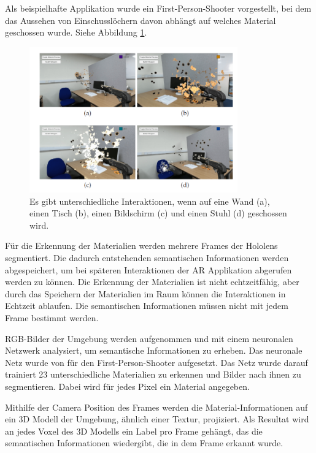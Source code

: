 Als beispielhafte Applikation wurde ein First-Person-Shooter vorgestellt, bei dem das Aussehen von Einschusslöchern davon abhängt auf welches Material geschossen wurde. Siehe Abbildung \ref{img:game}.

\begin{figure}[h]
	\centering
	\includegraphics[width=0.8\textwidth]{images/img_shootinggame.png}
	\caption[Context Aware Shooter von \cite{contextawaremixedreality}]{Es gibt unterschiedliche Interaktionen, wenn auf eine Wand (a), einen Tisch (b), einen Bildschirm (c) und einen Stuhl (d) geschossen wird.\citep{contextawaremixedreality}}
	\label{img:game}
\end{figure}

Für die Erkennung der Materialien werden mehrere Frames der Hololens segmentiert. Die dadurch entstehenden semantischen Informationen werden abgespeichert, um bei späteren Interaktionen der AR Applikation abgerufen werden zu können. Die Erkennung der Materialien ist nicht echtzeitfähig, aber durch das Speichern der Materialien im Raum können die Interaktionen in Echtzeit ablaufen. Die semantischen Informationen müssen nicht mit jedem Frame bestimmt werden.

RGB-Bilder der Umgebung werden aufgenommen und mit einem neuronalen Netzwerk analysiert, um semantische Informationen zu erheben. Das neuronale Netz wurde von \cite{contextawaremixedreality} für den First-Person-Shooter aufgesetzt. Das Netz wurde darauf trainiert 23 unterschiedliche Materialien zu erkennen und Bilder nach ihnen zu segmentieren. Dabei wird für jedes Pixel ein Material angegeben.

Mithilfe der Camera Position des Frames werden die Material-Informationen auf ein 3D Modell der Umgebung, ähnlich einer Textur, projiziert. Als Resultat wird an jedes Voxel des 3D Modells ein Label pro Frame gehängt, das die semantischen Informationen wiedergibt, die in dem Frame erkannt wurde.

